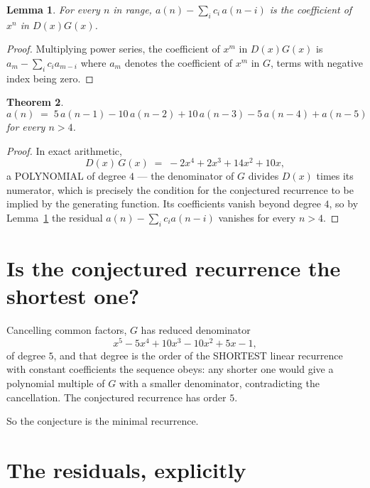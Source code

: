 \documentclass[11pt,a4paper]{article}
\theoremstyle{plain}
\newtheorem{theorem}{Theorem}
\newtheorem{lemma}[theorem]{Lemma}
\theoremstyle{definition}
\begin{document}
\begin{lemma}\label{lem:key}
For every $n$ in range, $a(n)-\sum_i c_i\,a(n-i)$ is the coefficient of $x^{n}$ in
$D(x)G(x)$.
\end{lemma}

\begin{proof}
Multiplying power series, the coefficient of $x^{m}$ in $D(x)G(x)$ is
$a_m-\sum_i c_i a_{m-i}$ where $a_m$ denotes the coefficient of $x^{m}$ in $G$, terms with
negative index being zero.
\end{proof}

\begin{theorem}
\[
a(n)\;=\;5\,a(n-1) - 10\,a(n-2) + 10\,a(n-3) - 5\,a(n-4) + a(n-5)
\]
for every $n>4$.
\end{theorem}

\begin{proof}
In exact arithmetic,
\[
D(x)\,G(x)\;=\;- 2 x^{4} + 2 x^{3} + 14 x^{2} + 10 x,
\]
a POLYNOMIAL of degree $4$ --- the denominator of $G$ divides $D(x)$ times its numerator,
which is precisely the condition for the conjectured recurrence to be implied by the
generating function. Its coefficients vanish beyond degree $4$, so by
Lemma~\ref{lem:key} the residual $a(n)-\sum_ic_ia(n-i)$ vanishes for every
$n>4$.
\end{proof}

\section{Is the conjectured recurrence the shortest one?}

Cancelling common factors, $G$ has reduced denominator
\[
x^{5} - 5 x^{4} + 10 x^{3} - 10 x^{2} + 5 x - 1,
\]
of degree $5$, and that degree is the order of the SHORTEST linear recurrence with
constant coefficients the sequence obeys: any shorter one would give a polynomial multiple of
$G$ with a smaller denominator, contradicting the cancellation. The conjectured recurrence has
order $5$.

So the conjecture is the minimal recurrence.

\section{The residuals, explicitly}
\end{document}
